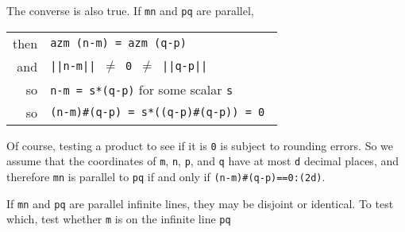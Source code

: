 \documentclass[12pt]{article}
\begin{document}
The converse is also true.  If {\tt mn} and {\tt pq} are parallel, \\
\hspace*{0.3in}\begin{tabular}{r@{~~}l}
then    & {\tt azm (n-m) = azm (q-p)} \\
and     & \tt ||n-m|| $\neq$ 0 $\neq$ ||q-p|| \\
so      & {\tt n-m = s*(q-p)} for some scalar {\tt s} \\
so      & \tt (n-m)\#(q-p) = s*((q-p)\#(q-p)) = 0 \\
        \end{tabular}

Of course, testing a product to see if it is {\tt 0} is subject to
rounding errors.  So we assume that the coordinates of {\tt m},
{\tt n}, {\tt p}, and {\tt q} have at most {\tt d} decimal places,
and therefore {\tt mn} is parallel to {\tt pq} if and only if
{\tt (n-m)\#(q-p)==0:(2d)}.

If {\tt mn} and {\tt pq} are parallel infinite lines, they
may be disjoint or identical.  To test which, test whether
{\tt m} is on the infinite line {\tt pq} 
\end{document}
